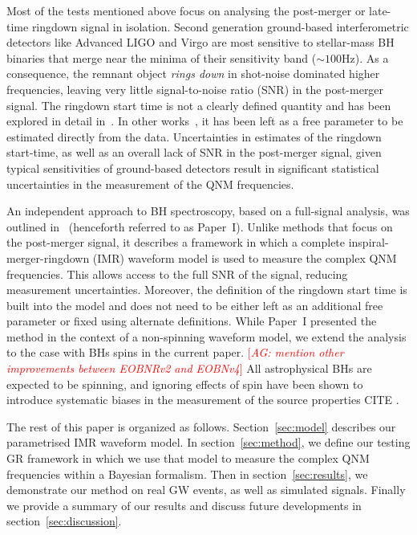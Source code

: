\documentclass[twocolumn,prd,superscriptaddress,amsfonts,amssymb,amsmath,preprintnumbers]{revtex4-1}
\newcommand{\paperone}{Paper~I\xspace}
\newcommand{\abhi}[1]{\textcolor{red}{[\textit{AG: #1}]}}
\begin{document}
\par
Most of the tests mentioned above focus on analysing the post-merger or late-time ringdown signal in isolation. Second generation ground-based interferometric detectors like Advanced LIGO and Virgo are most sensitive to stellar-mass BH binaries that merge near the minima of their sensitivity band ($\sim 100$Hz). As a consequence, the remnant object \textit{rings down} in shot-noise dominated higher frequencies, leaving very little signal-to-noise ratio (SNR) in the post-merger signal. The ringdown start time is not a clearly defined quantity and has been explored in detail in~\citep{Bhagwat:2017tkm}. In other works~\citep{Carullo:2018gah,Carullo:2019flw}, it has been left as a free parameter to be estimated directly from the data. Uncertainties in estimates of the ringdown start-time, as well as an overall lack of SNR in the post-merger signal, given typical sensitivities of ground-based detectors result in significant statistical uncertainties in the measurement of the QNM frequencies.
\par
An independent approach to BH spectroscopy, based on a full-signal analysis, was outlined in~\citep{Brito:2018rfr} (henceforth referred to as \paperone). Unlike methods that focus on the post-merger signal, it describes a framework in which a complete inspiral-merger-ringdown (IMR) waveform model is used to measure the complex QNM frequencies. This allows access to the full SNR of the signal, reducing measurement uncertainties. Moreover, the definition of the ringdown start time is built into the model and does not need to be either left as an additional free parameter or fixed using alternate definitions. While \paperone presented the method in the context of a non-spinning waveform model, we extend the analysis to the case with BHs spins in the current paper. \abhi{mention other improvements between EOBNRv2 and EOBNv4} All astrophysical BHs are expected to be spinning, and ignoring effects of spin have been shown to introduce systematic biases in the measurement of the source properties CITE \cite{paper_showing_systematics_from_ignoring_spin}.
\par
The rest of this paper is organized as follows. Section~\ref{sec:model} describes our parametrised IMR waveform model. In section~\ref{sec:method}, we define our testing GR framework in which we use that model to measure the complex QNM frequencies within a Bayesian formalism. Then in section~\ref{sec:results}, we demonstrate our method on real GW events, as well as simulated signals. Finally we provide a summary of our results and discuss future developments in section~\ref{sec:discussion}.
\end{document}
